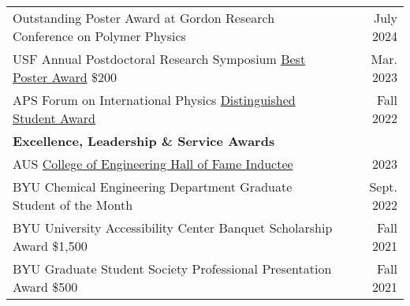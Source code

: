 \documentclass[letterpaper,11pt]{article}
\begin{document}
\begin{longtable}{@{}p{}r@{}}
  \hspace{3mm} Outstanding Poster Award at Gordon Research Conference on Polymer Physics                                                                                                                                                            & July 2024    \\ [4pt]
  \hspace{3mm} USF Annual Postdoctoral Research Symposium \href{https://www.usf.edu/postdoctoral-affairs/postdoc-services/postdoc-spotlight.aspx#:~:text=BEST\%20POSTERS\%3A-,Pierre\%20Kawak,-Exploring\%20Mechanisms\%20of}{Best Poster Award} \$200   & Mar. 2023    \\ [4pt]
  \hspace{3mm} APS Forum on International Physics \href{https://engage.aps.org/fip/honors/prizes-awards/ds-program}{Distinguished Student Award}                                                                                                    & Fall 2022    \\ [10pt] %
  \multicolumn{2}{l}{\hspace{-3mm} \bf{Excellence, Leadership \& Service Awards}} 	                                                                                                                                                                           \\ [5pt]
  \hspace{3mm} AUS \href{https://www.aus.edu/cen/alumni-hall-of-fame#:~:text=of\%20Technology\%20Sydney-,Dr.\%20Pierre\%20Kawak\%C2\%A0,-BS\%27\%2015\%20\%2D\%20Chemical}{College of Engineering Hall of Fame Inductee}                            & 2023         \\ [4pt]
  \hspace{3mm} BYU Chemical Engineering Department Graduate Student of the Month                                                                                                                                                                    & Sept. 2022   \\ [4pt]
  \hspace{3mm} BYU University Accessibility Center Banquet Scholarship Award \$1,500                                                                                                                                                                & Fall 2021    \\ [4pt] %
  \hspace{3mm} BYU Graduate Student Society Professional Presentation Award \$500                                                                                                                                                                   & Fall 2021    \\ [4pt] %

\end{longtable}
\end{document}
